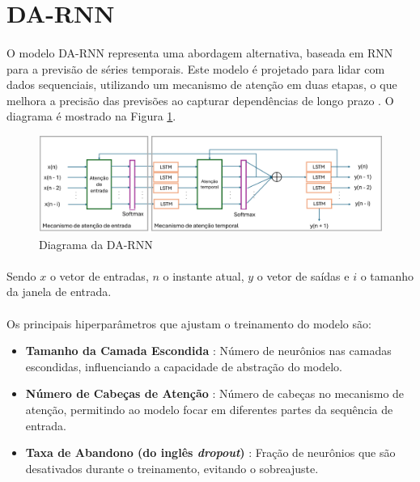 \section{\acf{DA-RNN}}

\paragraph{} O modelo \ac{DA-RNN} representa uma abordagem alternativa, baseada em \ac{RNN} para a previsão de séries temporais. Este modelo é projetado para lidar com dados sequenciais, utilizando um mecanismo de atenção em duas etapas, o que melhora a precisão das previsões ao capturar dependências de longo prazo \cite{zheng2017forecasting}. O diagrama é mostrado na Figura \ref{fig:darnn_diagram}.

\begin{figure}
	\begin{center}
		\begin{center}
			\includegraphics[width=1\textwidth]{figuras/darnn_diagram.png}
			\caption{Diagrama da \acs{DA-RNN}}
			\label{fig:darnn_diagram}
		\end{center}

	\end{center}
\end{figure}

\paragraph{} Sendo \(x\) o vetor de entradas, \(n\) o instante atual, \(y\) o vetor de saídas e \(i\) o tamanho da janela de entrada.

\paragraph{} Os principais hiperparâmetros que ajustam o treinamento do modelo são:
\begin{itemize}
	\item \textbf{Tamanho da Camada Escondida}      : Número de neurônios nas camadas escondidas, influenciando a capacidade de abstração do modelo.
	\item \textbf{Número de Cabeças de Atenção}		: Número de cabeças no mecanismo de atenção, permitindo ao modelo focar em diferentes partes da sequência de entrada.
	\item \textbf{Taxa de Abandono (do inglês \textit{dropout})}                 : Fração de neurônios que são desativados durante o treinamento, evitando o sobreajuste.
\end{itemize}

